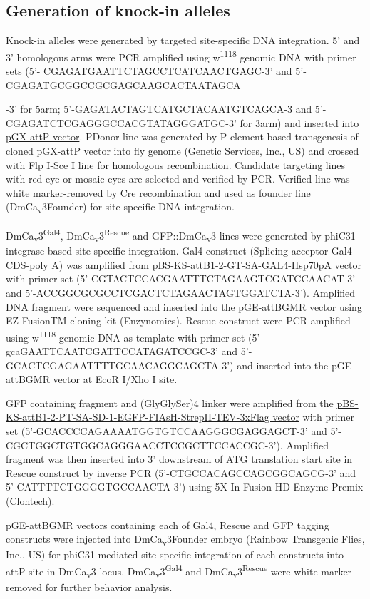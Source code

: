 \subsection*{Generation of knock-in alleles}

Knock-in alleles were generated by targeted site-specific DNA integration.
5' and 3' homologous arms were PCR amplified using w\textsuperscript{1118} genomic DNA with primer sets (5'- CGAGATGAATTCTAGCCTCATCAACTGAGC-3' and 5'- CGAGATGCGGCCGCGAGCAAGCACTAATAGCA

-3' for 5arm; 5'-GAGATACTAGTCATGCTACAATGTCAGCA-3 and 5'-CGAGATCTCGAGGGCCACGTATAGGGATGC-3' for 3arm) and inserted into \href{https://dgrc.cgb.indiana.edu/product/View?product=1293}{pGX-attP vector}.
P{Donor} line was generated by P-element based transgenesis of cloned pGX-attP vector into fly genome (Genetic Services, Inc., US) and crossed with Flp I-Sce I line for homologous recombination.
Candidate targeting lines with red eye or mosaic eyes are selected and verified by PCR.
Verified line was white marker-removed by Cre recombination and used as founder line (DmCa\textsubscript{v}3Founder) for site-specific DNA integration.

DmCa\textsubscript{v}3\textsuperscript{Gal4}, DmCa\textsubscript{v}3\textsuperscript{Rescue} and GFP::DmCa\textsubscript{v}3 lines were generated by phiC31 integrase based site-specific integration.
Gal4 construct (Splicing acceptor-Gal4 CDS-poly A) was amplified from \href{https://dgrc.cgb.indiana.edu/product/View?product=1325}{pBS-KS-attB1-2-GT-SA-GAL4-Hsp70pA vector} with primer set (5'-CGTACTCCACGAATTTCTAGAAGTCGATCCAACAT-3' and 5'-ACCGGCGCGCCTCGACTCTAGAACTAGTGGATCTA-3').
Amplified DNA fragment were sequenced and inserted into the \href{https://dgrc.cgb.indiana.edu/product/View?product=1295}{pGE-attBGMR vector} using EZ-FusionTM cloning kit (Enzynomics).
Rescue construct were PCR amplified using w\textsuperscript{1118} genomic DNA as template with primer set (5'-gcaGAATTCAATCGATTCCATAGATCCGC-3' and 5'-GCACTCGAGAATTTTGCAACAGGCAGCTA-3') and inserted into the pGE-attBGMR vector at EcoR I/Xho I site. 

GFP containing fragment and (GlyGlySer)4 linker were amplified from the \href{https://dgrc.cgb.indiana.edu/product/View?product=1306}{pBS-KS-attB1-2-PT-SA-SD-1-EGFP-FIAsH-StrepII-TEV-3xFlag vector} with primer set (5'-GCACCCCAGAAAATGGTGTCCAAGGGCGAGGAGCT-3' and 5'-CGCTGGCTGTGGCAGGGAACCTCCGCTTCCACCGC-3').
Amplified fragment was then inserted into 3' downstream of ATG translation start site in Rescue construct by inverse PCR (5'-CTGCCACAGCCAGCGGCAGCG-3' and 5'-CATTTTCTGGGGTGCCAACTA-3') using 5X In-Fusion HD Enzyme Premix (Clontech).  

pGE-attBGMR vectors containing each of Gal4, Rescue and GFP tagging constructs were injected into DmCa\textsubscript{v}3Founder embryo (Rainbow Transgenic Flies, Inc., US) for phiC31 mediated site-specific integration of each constructs into attP site in DmCa\textsubscript{v}3 locus.
DmCa\textsubscript{v}3\textsuperscript{Gal4} and DmCa\textsubscript{v}3\textsuperscript{Rescue} were white marker-removed for further behavior analysis.
    